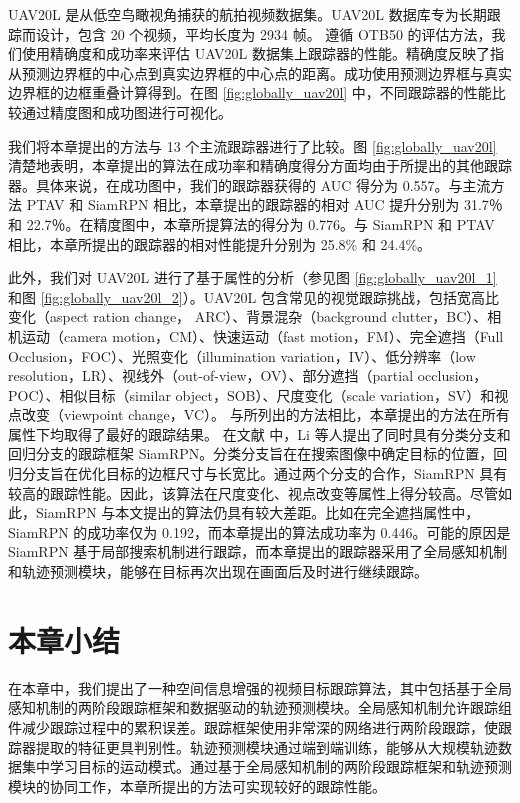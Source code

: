 UAV20L \cite{mueller2016benchmark} 是从低空鸟瞰视角捕获的航拍视频数据集。UAV20L 数据库专为长期跟踪而设计，包含 20 个视频，平均长度为 2934 帧。
遵循 OTB50 \cite{OTB} 的评估方法，我们使用精确度和成功率来评估 UAV20L 数据集上跟踪器的性能。精确度反映了指从预测边界框的中心点到真实边界框的中心点的距离。成功使用预测边界框与真实边界框的边框重叠计算得到。在图 \ref{fig:globally_uav20l} 中，不同跟踪器的性能比较通过精度图和成功图进行可视化。

我们将本章提出的方法与 13 个主流跟踪器进行了比较。图 \ref{fig:globally_uav20l} 清楚地表明，本章提出的算法在成功率和精确度得分方面均由于所提出的其他跟踪器。具体来说，在成功图中，我们的跟踪器获得的 AUC 得分为 0.557。与主流方法 PTAV \cite{fan2018parallel} 和 SiamRPN \cite{SiamRPN} 相比，本章提出的跟踪器的相对 AUC 提升分别为 31.7％ 和 22.7％。在精度图中，本章所提算法的得分为 0.776。与 SiamRPN \cite{SiamRPN} 和 PTAV \cite{fan2018parallel} 相比，本章所提出的跟踪器的相对性能提升分别为 25.8\% 和 24.4\%。

此外，我们对 UAV20L 进行了基于属性的分析（参见图 \ref{fig:globally_uav20l_1} 和图 \ref{fig:globally_uav20l_2}）。UAV20L 包含常见的视觉跟踪挑战，包括宽高比变化（aspect ration change，
ARC）、背景混杂（background clutter，BC）、相机运动（camera motion，CM）、快速运动（fast motion，FM）、完全遮挡（Full Occlusion，FOC）、光照变化（illumination variation，IV）、低分辨率（low resolution，LR）、视线外（out-of-view，OV）、部分遮挡（partial occlusion，POC）、相似目标（similar object，SOB）、尺度变化（scale variation，SV）和视点改变（viewpoint change，VC）。
与所列出的方法相比，本章提出的方法在所有属性下均取得了最好的跟踪结果。
在文献 \cite{SiamRPN} 中，Li 等人提出了同时具有分类分支和回归分支的跟踪框架 SiamRPN。分类分支旨在在搜索图像中确定目标的位置，回归分支旨在优化目标的边框尺寸与长宽比。通过两个分支的合作，SiamRPN 具有较高的跟踪性能。因此，该算法在尺度变化、视点改变等属性上得分较高。尽管如此，SiamRPN 与本文提出的算法仍具有较大差距。比如在完全遮挡属性中，SiamRPN 的成功率仅为 0.192，而本章提出的算法成功率为 0.446。可能的原因是 SiamRPN 基于局部搜索机制进行跟踪，而本章提出的跟踪器采用了全局感知机制和轨迹预测模块，能够在目标再次出现在画面后及时进行继续跟踪。

\section{本章小结}
在本章中，我们提出了一种空间信息增强的视频目标跟踪算法，其中包括基于全局感知机制的两阶段跟踪框架和数据驱动的轨迹预测模块。全局感知机制允许跟踪组件减少跟踪过程中的累积误差。跟踪框架使用非常深的网络进行两阶段跟踪，使跟踪器提取的特征更具判别性。轨迹预测模块通过端到端训练，能够从大规模轨迹数据集中学习目标的运动模式。通过基于全局感知机制的两阶段跟踪框架和轨迹预测模块的协同工作，本章所提出的方法可实现较好的跟踪性能。